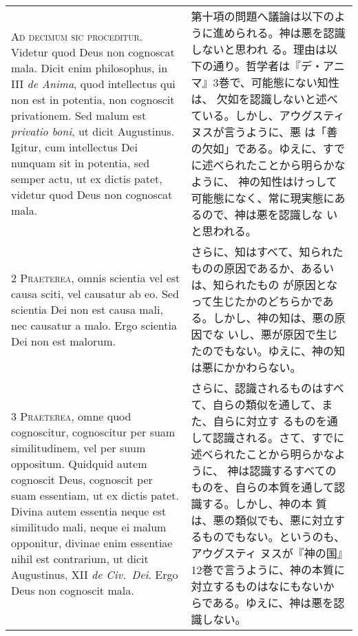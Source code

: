 \documentclass[10pt]{jsarticle} %
\begin{document}
\begin{longtable}{p{21em}p{21em}}



{\huge A}{\scshape d decimum sic proceditur}. Videtur quod Deus non
cognoscat mala. Dicit enim philosophus, in III {\itshape de Anima}, quod
intellectus qui non est in potentia, non cognoscit privationem. Sed
malum est {\itshape privatio boni}, ut dicit Augustinus. Igitur, cum
intellectus Dei nunquam sit in potentia, sed semper actu, ut ex dictis
patet, videtur quod Deus non cognoscat mala.


&

第十項の問題へ議論は以下のように進められる。神は悪を認識しないと思われ
る。理由は以下の通り。哲学者は『デ・アニマ』3巻で、可能態にない知性は、
欠如を認識しないと述べている。しかし、アウグスティヌスが言うように、悪
は「善の欠如」である。ゆえに、すでに述べられたことから明らかなように、
神の知性はけっして可能態になく、常に現実態にあるので、神は悪を認識しな
いと思われる。

\\


{\scshape 2 Praeterea}, omnis scientia vel est causa
sciti, vel causatur ab eo. Sed scientia Dei non est causa mali, nec
causatur a malo. Ergo scientia Dei non est malorum.

&

さらに、知はすべて、知られたものの原因であるか、あるいは、知られたもの
が原因となって生じたかのどちらかである。しかし、神の知は、悪の原因でな
いし、悪が原因で生じたのでもない。ゆえに、神の知は悪にかかわらない。

\\


{\scshape 3 Praeterea}, omne quod cognoscitur,
cognoscitur per suam similitudinem, vel per suum oppositum. Quidquid
autem cognoscit Deus, cognoscit per suam essentiam, ut ex dictis
patet. Divina autem essentia neque est similitudo mali, neque ei malum
opponitur, divinae enim essentiae nihil est contrarium, ut dicit
Augustinus, XII {\itshape de Civ.~Dei}. Ergo Deus non cognoscit mala.

&

さらに、認識されるものはすべて、自らの類似を通して、また、自らに対立す
るものを通して認識される。さて、すでに述べられたことから明らかなように、
神は認識するすべてのものを、自らの本質を通して認識する。しかし、神の本
質は、悪の類似でも、悪に対立するものでもない。というのも、アウグスティ
ヌスが『神の国』12巻で言うように、神の本質に対立するものはなにもないか
らである。ゆえに、神は悪を認識しない。


\end{longtable}
\end{document}
